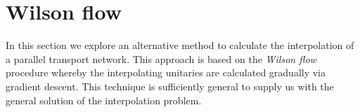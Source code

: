 \documentclass[12pt]{amsart}
\theoremstyle{definition}
\theoremstyle{remark}
\numberwithin{equation}{section}
\begin{document}


\section{Wilson flow}
In this section we explore an alternative method to calculate the interpolation of a parallel transport network. This approach is based on the \emph{Wilson flow} procedure whereby the interpolating unitaries are calculated gradually via gradient descent. This technique is sufficiently general to supply us with the general solution of the interpolation problem.
\end{document}

